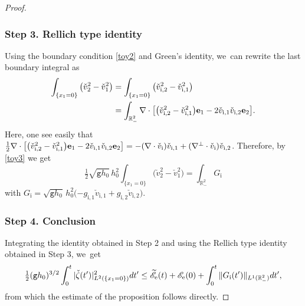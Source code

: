 \documentclass[11pt]{article}
\newcommand{\gr}{{\mathtt g}}
\newcommand{\R}{{\mathbb R}}
\theoremstyle{definition}
\begin{document}
\begin{proof}
\subsubsection*{Step 3. Rellich type identity}
Using the boundary condition \eqref{toy2} and Green's identity, we~can rewrite the last boundary integral as
\begin{align*}
\int_{\{x_1=0\}}\big(\check{v}_2^2- \check{v}_1^2\big)
&= \int_{\{x_1=0\}}\big(\check{v}_\mathrm{i,2}^2- \check{v}_\mathrm{i,1}^2\big)\\
&= \int_{\R^2_-}\nabla\cdot \big[\big(\check{v}_\mathrm{i,2}^2- \check{v}_\mathrm{i,1}^2\big) {\bf e}_1- 2 \check{v}_\mathrm{i,1}\check{v}_\mathrm{i,2}{\bf e}_2\big].
\end{align*}
Here, one see easily that
$\frac{1}{2}\nabla\cdot \big[\big(\check{v}_\mathrm{i,2}^2-\check{v}_\mathrm{i,1}^2\big) {\bf e}_1- 2 \check{v}_\mathrm{i,1}\check{v}_\mathrm{i,2}{\bf e}_2\big]
=-(\nabla\cdot \check{v}_\mathrm{i})\check{v}_\mathrm{i,1}+(\nabla^\perp \cdot \check{v}_\mathrm{i})\check{v}_\mathrm{i,2}$.
Therefore, by \eqref{toy3} we get
\[
\tfrac{1}{2}\sqrt{\gr h_0}\,h_0^2 \int_{\{x_1=0\}} \big(\check{v}_2^2-\check{v}_1^2\big)=\int_{\R^2_-}G_\mathrm{i}
\]
with $G_\mathrm{i}=\sqrt{\gr h_0}\,h_0^2 (-g_\mathrm{i,1}\check{v}_\mathrm{i,1}+g_\mathrm{i,2}\check{v}_\mathrm{i,2}\big)$.

\subsubsection*{Step 4. Conclusion}
Integrating the identity obtained in Step 2 and using the Rellich type identity obtained in Step 3, we~get
\[
\tfrac{1}{2}(\gr h_0)^{3/2}\int_0^t \vert \check{\zeta}(t')\vert^2_{L^2(\{x_1=0\})}{\rm d}t'
\leq \widetilde{\mathscr E}_\mathrm{e}(t) + {\mathscr E}_\mathrm{e}(0)+\int_0^t \Vert G_\mathrm{i}(t')\Vert_{L^1(\R^2_-)}{\rm d}t',
\]
from which the estimate of the proposition follows directly.
\end{proof}
\end{document}
